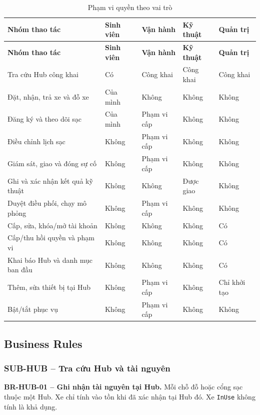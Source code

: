 \begingroup
\small
\begin{longtable}{|L{48mm}|L{22mm}|L{22mm}|L{22mm}|L{22mm}|}
  \caption{Phạm vi quyền theo vai trò}\label{tab:role-permissions}\\
  \hline
  \textbf{Nhóm thao tác} & \textbf{Sinh viên} & \textbf{Vận hành} & \textbf{Kỹ thuật} & \textbf{Quản trị}\\\hline
  \endfirsthead
  \hline
  \textbf{Nhóm thao tác} & \textbf{Sinh viên} & \textbf{Vận hành} & \textbf{Kỹ thuật} & \textbf{Quản trị}\\\hline
  \endhead
  Tra cứu Hub công khai & Có & Công khai & Công khai & Công khai\\\hline
  Đặt, nhận, trả xe và đỗ xe & Của mình & Không & Không & Không\\\hline
  Đăng ký và theo dõi sạc & Của mình & Phạm vi cấp & Không & Không\\\hline
  Điều chỉnh lịch sạc & Không & Phạm vi cấp & Không & Không\\\hline
  Giám sát, giao và đóng sự cố & Không & Phạm vi cấp & Không & Không\\\hline
  Ghi và xác nhận kết quả kỹ thuật & Không & Không & Được giao & Không\\\hline
  Duyệt điều phối, chạy mô phỏng & Không & Phạm vi cấp & Không & Không\\\hline
  Cấp, sửa, khóa/mở tài khoản & Không & Không & Không & Có\\\hline
  Cấp/thu hồi quyền và phạm vi & Không & Không & Không & Có\\\hline
  Khai báo Hub và danh mục ban đầu & Không & Không & Không & Có\\\hline
  Thêm, sửa thiết bị tại Hub & Không & Phạm vi cấp & Không & Chỉ khởi tạo\\\hline
  Bật/tắt phục vụ & Không & Phạm vi cấp & Không & Không\\\hline
\end{longtable}
\endgroup

\subsection{Business Rules}

\subsubsection{SUB-HUB -- Tra cứu Hub và tài nguyên}

\noindent\textbf{BR-HUB-01 -- Ghi nhận tài nguyên tại Hub.} Mỗi chỗ đỗ hoặc cổng sạc thuộc một Hub. Xe chỉ tính vào tồn khi đã xác nhận tại Hub đó. Xe \texttt{InUse} không tính là khả dụng.

